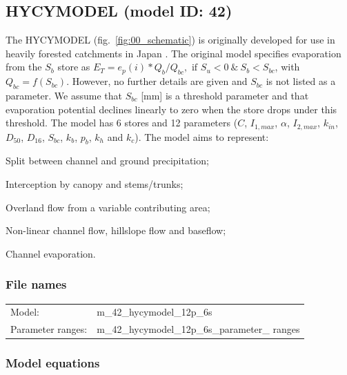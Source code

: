 \subsection{HYCYMODEL (model ID: 42)}
The HYCYMODEL (fig.~\ref{fig:00_schematic}) is originally developed for use in heavily forested catchments in Japan \citep{Fukushima1988}. The original model specifies evaporation from the $S_b$ store as $E_T = e_p(i)*Q_b/Q_{bc}, \text{ if } S_u < 0 ~\&~ S_b < S_{bc}$, with $Q_{bc} = f(S_{bc})$. However, no further details are given and $S_{bc}$ is not listed as a parameter. We assume that $S_{bc}$ [mm] is a threshold  parameter and that evaporation potential declines linearly to zero when the store drops under this threshold. The model has 6 stores and 12 parameters ($C$, $I_{1,max}$, $\alpha$, $I_{2,max}$, $k_{in}$, $D_{50}$, $D_{16}$, $S_{bc}$, $k_b$, $p_b$, $k_h$ and $k_c$). The model aims to represent:

\begin{itemizecompact}
\item Split between channel and ground precipitation;
\item Interception by canopy and stems/trunks;
\item Overland flow from a variable contributing area;
\item Non-linear channel flow, hillslope flow and baseflow;
\item Channel evaporation.
\end{itemizecompact}

\subsubsection{File names}
\begin{tabular}{@{}ll}
Model: &m\_42\_hycymodel\_12p\_6s \\
Parameter ranges: &m\_42\_hycymodel\_12p\_6s\_parameter\_ ranges \\
\end{tabular}

\subsubsection{Model equations}

